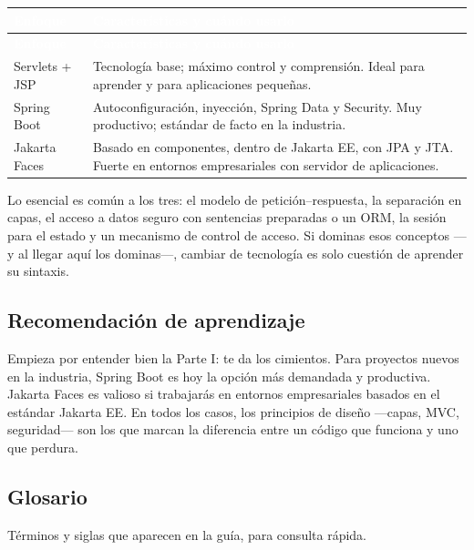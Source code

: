 \documentclass[11pt]{article}
\begin{document}
{\renewcommand{\arraystretch}{1.25}
\begin{longtable}{>{\raggedright\arraybackslash}p{3.2cm} >{\raggedright\arraybackslash}p{12.2cm}}
\rowcolor{jwebazul}\textcolor{white}{\textbf{Enfoque}} & \textcolor{white}{\textbf{Características y cuándo usarlo}} \\
\endfirsthead
\rowcolor{jwebazul}\textcolor{white}{\textbf{Enfoque}} & \textcolor{white}{\textbf{Características y cuándo usarlo}} \\
\endhead
\ttfamily\color{jwebazul}Servlets + JSP & Tecnología base; máximo control y comprensión. Ideal para aprender y para aplicaciones pequeñas. \\ \hline
\ttfamily\color{jwebazul}Spring Boot & Autoconfiguración, inyección, Spring Data y Security. Muy productivo; estándar de facto en la industria. \\ \hline
\ttfamily\color{jwebazul}Jakarta Faces & Basado en componentes, dentro de Jakarta EE, con JPA y JTA. Fuerte en entornos empresariales con servidor de aplicaciones. \\ \hline
\end{longtable}}
Lo esencial es común a los tres: el modelo de petición–respuesta, la separación en capas, el acceso a datos seguro con sentencias preparadas o un ORM, la sesión para el estado y un mecanismo de control de acceso. Si dominas esos conceptos —y al llegar aquí los dominas—, cambiar de tecnología es solo cuestión de aprender su sintaxis.

\subsection{Recomendación de aprendizaje}
Empieza por entender bien la Parte I: te da los cimientos. Para proyectos nuevos en la industria, Spring Boot es hoy la opción más demandada y productiva. Jakarta Faces es valioso si trabajarás en entornos empresariales basados en el estándar Jakarta EE. En todos los casos, los principios de diseño —capas, MVC, seguridad— son los que marcan la diferencia entre un código que funciona y uno que perdura.

\subsection{Glosario}
Términos y siglas que aparecen en la guía, para consulta rápida.
\end{document}
